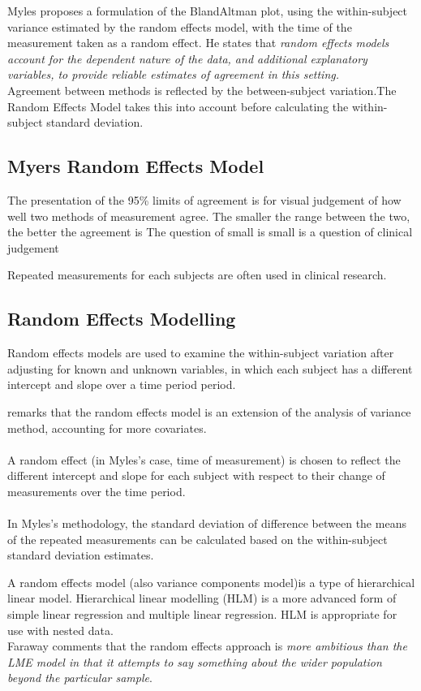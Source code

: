 \documentclass[12pt, a4paper]{report}
\theoremstyle{plain}
\theoremstyle{definition}
\theoremstyle{remark}
\begin{document}
Myles proposes a formulation of the BlandAltman
plot, using the within-subject variance estimated by the random
effects model, with the time of the measurement taken as a random
effect. He states that \emph{random effects models account for the
	dependent nature of the data, and additional explanatory
	variables, to provide reliable estimates of agreement in this
	setting.}
\\
Agreement between methods is reflected by the between-subject
variation.The Random Effects Model takes this into account before
calculating the within-subject standard deviation.
\subsection{Myers Random Effects Model} The presentation of the
95\% limits of agreement is for visual judgement of how well two
methods of measurement agree. The smaller the range between the
two, the better the agreement is The question of small is small is
a question of clinical judgement


Repeated measurements for each subjects are often used in clinical
research.



\subsection{Random Effects Modelling}
Random effects models are used to examine the within-subject
variation after adjusting for known and unknown variables, in
which each subject has a different intercept and slope over a time
period period.


\citet{Myles} remarks that the random effects model is an
extension of the analysis of variance method, accounting for more
covariates.
\\
\\
A random effect (in Myles's case, time of measurement) is chosen
to reflect the different intercept and slope for each subject with
respect to their change of measurements over the time period.
\\
\\
In Myles's methodology, the standard deviation of difference
between the means of the repeated measurements can be calculated
based on the within-subject standard deviation estimates.

A random effects model (also variance components model)is a type
of hierarchical linear model. Hierarchical linear modelling (HLM)
is a more advanced form of simple linear regression and multiple
linear regression. HLM is appropriate for use with nested
data.\\Faraway comments that the random effects approach is
\emph{more ambitious than the LME model in that it attempts to say
	something about the wider population beyond the particular
	sample}.
\end{document}
